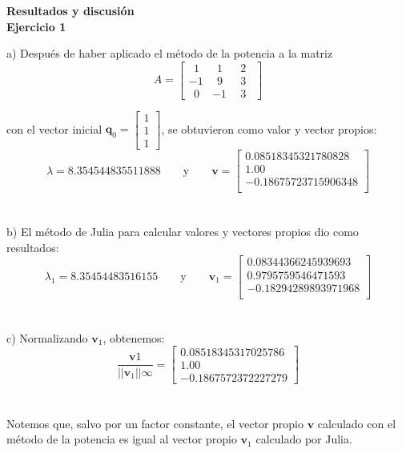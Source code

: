 \documentclass[11pt]{article}
\begin{document}
\newpage
\textbf{\LARGE{Resultados y discusión}}
\\
\noindent
\textbf{Ejercicio 1}

a) Después de haber aplicado el método de la potencia a la matriz
$$
A =
\begin{bmatrix}
\ \ 1 & \ \ 1 & \ \ 2 \ \ \\
-1 & \ \ 9 & \ \ 3 \ \ \\
\ \ 0 & -1 & \ \ 3 \ \
\end{bmatrix}
$$

con el vector inicial $\textbf{q}_0 =
\begin{bmatrix}
1 \\
1 \\
1
\end{bmatrix}$, se obtuvieron como valor y vector propios:
 \[
 \lambda = 8.354544835511888
 \qquad\text{y}\qquad
 \textbf{v} = \begin{bmatrix}
 0.08518345321780828 \\
 1.00     \\
 -0.18675723715906348 \\
\end{bmatrix}
 \]
 \\
 \\

b) El método de Julia para calcular valores y vectores propios dio como resultados:
\[
 \lambda_1 = 8.35454483516155
 \qquad\text{y}\qquad
 \textbf{v}_1 = \begin{bmatrix}
0.08344366245939693 \\
0.9795759546471593 \\
-0.18294289893971968 \\
\end{bmatrix}
 \]
 \\
 \\

 c) Normalizando $\textbf{v}_1$, obtenemos:
 $$\frac{\textbf{v}1}{||\textbf{v}_1||\infty} =
\begin{bmatrix}
0.08518345317025786 \\
1.00 \\
-0.1867572372227279
\end{bmatrix}$$
\\
\\

Notemos que, salvo por un factor constante, el vector propio $\textbf{v}$ calculado con el método de la potencia es igual al vector propio $\textbf{v}_1$ calculado por Julia.
\\
\\
\end{document}
